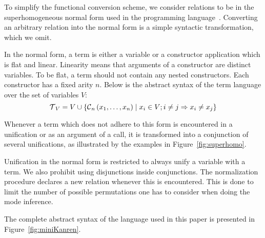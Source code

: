 To simplify the functional conversion scheme, we consider \mk relations to be in the superhomogeneous normal form used in the \merc programming language~\cite{somogyi1996execution}.
Converting an arbitrary \mk relation into the normal form is a simple syntactic transformation, which we omit.

In the normal form, a term is either a variable or a constructor application which is flat and linear.
Linearity means that arguments of a constructor are distinct variables.
To be flat, a term should not contain any nested constructors.
Each constructor has a fixed arity $n$.
Below is the abstract syntax of the term language over the set of variables $V$:
\[  \operatorname{\mathcal{T}}_{V} = V \cup \{\operatorname{\mathcal{C}}_{n}\left( x_1, \ldots, x_{n} \right) \mid x_{i}\in V; i \neq j \Rightarrow x_i \neq x_j\} \]

Whenever a term which does not adhere to this form is encountered in a unification or as an argument of a call, it is transformed into a conjunction of several unifications, as illustrated by the examples in Figure~\ref{fig:superhomo}.

Unification in the normal form is restricted to always unify a variable with a term.
We also prohibit using disjunctions inside conjunctions.
The normalization procedure declares a new relation whenever this is encountered.
This is done to limit the number of possible permutations one has to consider when doing the mode inference.

The complete abstract syntax of the \mk language used in this paper is presented in Figure~\ref{fig:miniKanren}.
